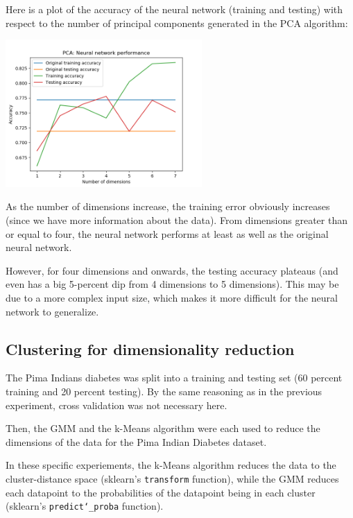 \documentclass[11pt]{article}
\begin{document}
            Here is a plot of the accuracy of the neural network (training and testing) with
            respect to the number of principal components generated in the
            PCA algorithm:

            \includegraphics[width=7.5cm]{../pima/nn_pca/nn_pca.png}

            As the number of dimensions increase, the training error obviously increases
            (since we have more information about the data). From dimensions greater than or equal to four,
            the neural network performs at least as well as the original neural network.

            However, for four dimensions and onwards, the testing accuracy plateaus
            (and even has a big 5-percent dip from 4 dimensions to 5 dimensions).
            This may be due to a more complex input size, which makes it more
            difficult for the neural network to generalize.



            \subsection{Clustering for dimensionality reduction}

            The Pima Indians diabetes was split into a training and testing set (60
            percent training and 20 percent testing). By the same reasoning as in the previous
            experiment, cross validation was not necessary here.

            Then, the GMM and the k-Means algorithm were each used to reduce the dimensions of
            the data for the Pima Indian Diabetes dataset.

            In these specific experiements, the k-Means
            algorithm reduces the data to the cluster-distance space (sklearn's \texttt{transform}
            function), while the GMM reduces each datapoint to the probabilities
            of the datapoint being in each cluster (sklearn's \texttt{predict\char`_proba} function).
            
\end{document}
